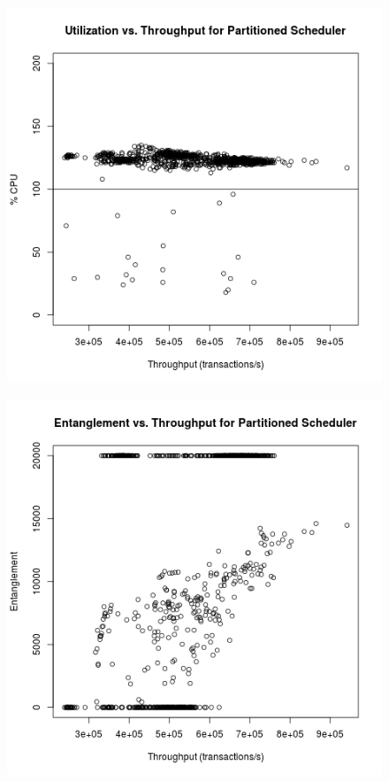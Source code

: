 \begin{figure}
\center
\includegraphics[width=\textwidth]{partitioned_throughput_utilization.png}
\caption{\label{partitioned_throughput_utilization}}
\end{figure}

\begin{figure}
\center
\includegraphics[width=\textwidth]{partitioned_throughput_entanglement.png}
\caption{\label{partitioned_throughput_entanglement}}
\end{figure}


